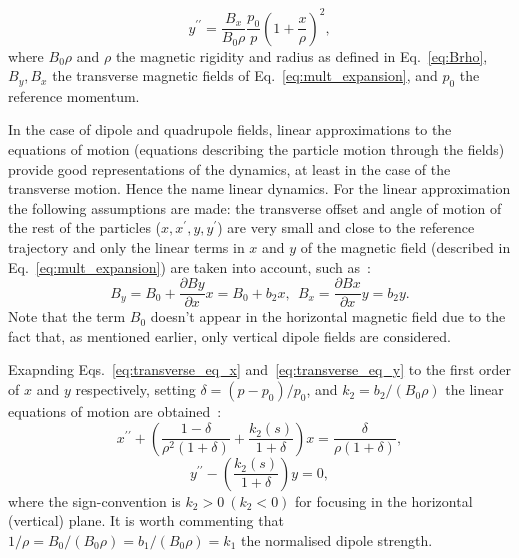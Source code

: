 \begin{equation}\label{eq:transverse_eq_y}
    y^{\prime \prime} = \frac{B_x}{B_0 \rho} \frac{p_0}{p}  \left (  1+ \frac{x}{\rho} \right )^2, 
\end{equation}
where $B_0 \rho$ and $\rho$ the magnetic rigidity and radius as defined in Eq.~\eqref{eq:Brho},  $B_y, B_x$ the transverse magnetic fields of Eq.~\eqref{eq:mult_expansion}, and $p_0$ the reference momentum.

In the case of dipole and quadrupole fields, linear approximations to the equations of motion (equations describing the particle motion through the fields) provide good representations of the dynamics, at least in the case of the transverse motion. Hence the name linear dynamics. For the linear approximation the following assumptions are made: the transverse offset and angle of motion of the rest of the particles ($x, x^\prime, y, y^\prime$) are very small and close to the reference trajectory and only the linear terms in $x$ and $y$ of the magnetic field (described in Eq.~\eqref{eq:mult_expansion}) are taken into account, such as~\cite{Lee:1425444}: %
\begin{equation}
    B_y = B_0 + \frac{\partial By}{\partial x}x  =B_0 + b_2 x, \ \ B_x = \frac{\partial Bx}{\partial x}y  = b_2 y.  
\end{equation}
Note that the term $B_0$ doesn't appear in the horizontal magnetic field due to the fact that, as mentioned earlier, only vertical dipole fields are considered. 

Exapnding Eqs.~\eqref{eq:transverse_eq_x} and~\eqref{eq:transverse_eq_y} to the first order of $x$ and $y$ respectively, setting $\delta = (p-p_0)/p_0$, and $k_2=b_2 /(B_0\rho)$ the linear equations of motion are obtained~\cite{Lee:1425444}:
\begin{equation}\label{eq:linear_eq_of_motion_x}
    x^{\prime \prime} + \left (  \frac{1-\delta}{\rho^2 (1+\delta)}  + \frac{k_2(s)}{1+\delta} \right )x = \frac{\delta}{\rho (1+\delta)}, 
\end{equation}
\begin{equation}\label{eq:linear_eq_of_motion_y}
    y^{\prime \prime} -  \left ( \frac{k_2(s)}{1+\delta} \right ) y = 0,
\end{equation}
where the sign-convention is $k_2>0 \ (k_2<0)$ for focusing in the horizontal (vertical) plane. It is worth commenting that $1/\rho = B_0/(B_0 \rho) = b_1/(B_0 \rho)=k_1$ the normalised dipole strength.

